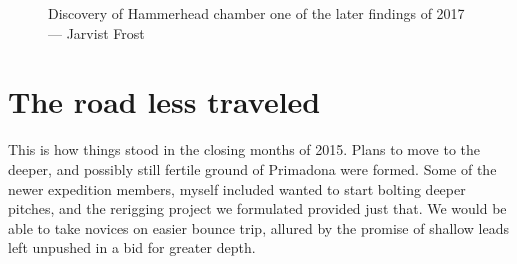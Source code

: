 	\begin{figure}[h!]
	\checkoddpage \ifoddpage \forcerectofloat \else \forceversofloat \fi
	\centering
  	\caption{Discovery of Hammerhead chamber one of the later findings of 2017 --- Jarvist Frost}
	\end{figure}

\section{The road less traveled}
This is how things stood in the closing months of 2015. Plans to move to the deeper, and possibly still fertile ground of Primadona were formed. Some of the newer expedition members, myself included wanted to start bolting deeper pitches, and the rerigging project we formulated provided just that. We would be able to take novices on easier bounce trip, allured by the promise of shallow leads left unpushed in a bid for greater depth.

